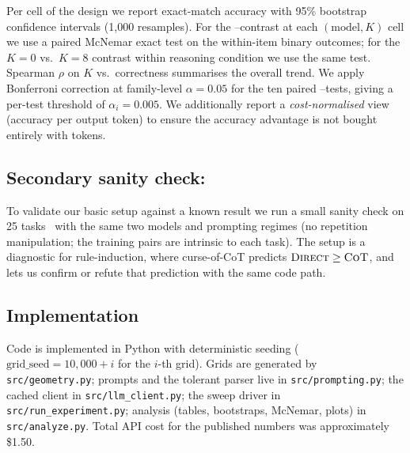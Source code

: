 Per cell of the design we report exact-match accuracy with 95\%
bootstrap confidence intervals (1{,}000 resamples). For the
\Direct--\COT contrast at each $(\text{model}, K)$ cell we use a paired
McNemar exact test on the within-item binary outcomes; for the
$K{=}0$ vs.\ $K{=}8$ contrast within reasoning condition we use the
same test. Spearman $\rho$ on $K$ vs.\ correctness summarises the
overall trend. We apply Bonferroni correction at family-level
$\alpha{=}0.05$ for the ten paired \Direct--\COT tests, giving a
per-test threshold of $\alpha_i{=}0.005$. We additionally report a
\emph{cost-normalised} view (accuracy per output token) to ensure the
\COT accuracy advantage is not bought entirely with tokens.

\subsection{Secondary sanity check: \miniarc}

To validate our basic setup against a known result we run a small
sanity check on 25 \miniarc tasks~\citep{cot_icl_eval2024} with the
same two models and prompting regimes (no repetition manipulation; the
training pairs are intrinsic to each task). The \miniarc setup is a
diagnostic for rule-induction, where curse-of-CoT predicts
$\textsc{Direct} \ge \textsc{CoT}$, and lets us confirm or refute that prediction
with the same code path.

\subsection{Implementation}

Code is implemented in Python with deterministic seeding
($\text{grid\_seed} = 10{,}000 + i$ for the $i$-th grid). Grids are
generated by \texttt{src/geometry.py}; prompts and the tolerant
parser live in \texttt{src/prompting.py}; the cached client in
\texttt{src/llm\_client.py}; the sweep driver in
\texttt{src/run\_experiment.py}; analysis (tables, bootstraps,
McNemar, plots) in \texttt{src/analyze.py}. Total API cost for the
published numbers was approximately \$1.50.
